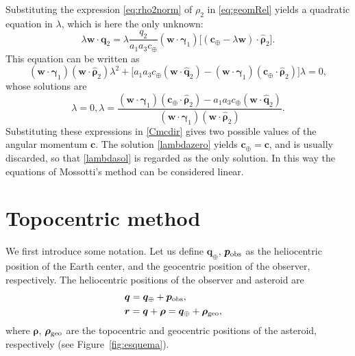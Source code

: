 \documentclass[11pt]{article}
\def\angmom{\bm{c}}
\def\bq{\bm{q}}
\def\pobs{\bm{p}_{\rm obs}}
\def\rhovec{{\bm{\rho}}}
\def\erre{{\bm{r}}}
\def\angmom{{\bm{c}}}
\begin{document}
%
Substituting the expression \eqref{eq:rho2norm} of $\rho_2$ in \eqref{eq:geomRel} yields a quadratic equation in $\lambda$, which is here the only unknown:
%
\begin{equation*}
    \lambda\bm{w}\cdot\bm{q}_2 = \lambda\frac{q_2}{a_1a_3 c_\oplus}\left(\bm{w}\cdot\bm{\gamma}_1\right)\big[(\bm{c}_\oplus
    - \lambda\bm{w})\cdot\hat{\bm{\rho}}_2\big].
\end{equation*}
%
This equation can be written as
%
\begin{equation}\label{eq:slgeo}
    (\bm{w}\cdot\bm{\gamma}_1)(\bm{w}\cdot\hat{\bm{\rho}}_2) \lambda^2 + 
    \big[a_1a_3c_\oplus(\bm{w}\cdot\hat{\bm{q}}_2)-(\bm{w}\cdot\bm{\gamma}_1)
    (\bm{c}_\oplus\cdot\hat{\bm{\rho}}_2)\big]\lambda = 0,
\end{equation}
%
whose  solutions are
\begin{subequations}
    \begin{equation}
        \lambda = 0,
        \label{lambdazero}
    \end{equation}
    \begin{equation}
        \lambda = \frac{(\bm{w}\cdot\bm{\gamma}_1)(\bm{c}_\oplus\cdot\hat{\bm{\rho}}_2) -
        a_1a_3c_\oplus(\bm{w}\cdot\hat{\bm{q}}_2)}{(\bm{w}\cdot\bm{\gamma}_1)(\bm{w}\cdot\hat{\bm{\rho}}_2)}.
        \label{lambdasol}
    \end{equation}
\end{subequations}
Substituting these expressions in \eqref{Cmcdir} gives two possible values of the angular momentum $\angmom$.
The solution \eqref{lambdazero} yields $\angmom_\oplus=\angmom$, and is usually discarded, so that \eqref{lambdasol} is regarded as the only solution.
In this way the equations of Mossotti's method can be considered linear.



\section{Topocentric method}
\label{s:mossotti_top}

We first introduce some notation. Let us define $\bq_\oplus$, $\pobs$
as the heliocentric position of the Earth center, and the geocentric
position of the observer, respectively. The heliocentric positions of
the observer and asteroid are
\begin{equation*}
    \begin{aligned}
    & \bq=\bq_\oplus+\pobs,\cr
    & \erre = \bq + \rhovec = \bq_\oplus + \rhovec_{\rm geo},\cr
    \end{aligned}
\end{equation*}
where $\rhovec$, $\rhovec_{\rm geo}$ are the topocentric and geocentric positions of the asteroid, respectively (see Figure~\ref{fig:esquema}).
\end{document}
